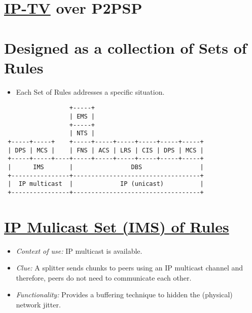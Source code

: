 \documentclass{article}
\begin{document}

\section{\href{https://en.wikipedia.org/wiki/IPTV}{IP-TV} over P2PSP}

\ifx \HCode\Undfef
\else
{}
\fi


\section{Designed as a collection of Sets of Rules}

\begin{itemize}
\item Each Set of Rules addresses a specific situation.
\end{itemize}

\begin{center}
\begin{verbatim}
                  +-----+
                  | EMS |
                  +-----+
                  | NTS |
 +-----+-----+    +-----+-----+-----+-----+-----+-----+
 | DPS | MCS |    | FNS | ACS | LRS | CIS | DPS | MCS |
 +-----+-----+----+-----+-----+-----+-----+-----+-----+
 |      IMS       |                DBS                |
 +----------------+-----------------------------------+
 |  IP multicast  |             IP (unicast)          |
 +----------------+-----------------------------------+
\end{verbatim}
\end{center}


\section{\href{http://www.p2psp.org/en/p2psp-protocol?cap=indexsu4.xht\#x11-90004.4}{IP Mulicast Set (IMS) of Rules}}

\begin{itemize}
\item \emph{Context of use:} IP multicast is available.
\item \emph{Clue:} A splitter sends chunks to peers using an IP multicast channel
  and therefore, peers do not need to communicate each other.
\item \emph{Functionality:} Provides a buffering technique to hidden the (physical) network jitter.
\end{itemize}
\ifx \HCode\Undfef
\else
{}
\fi
\end{document}
